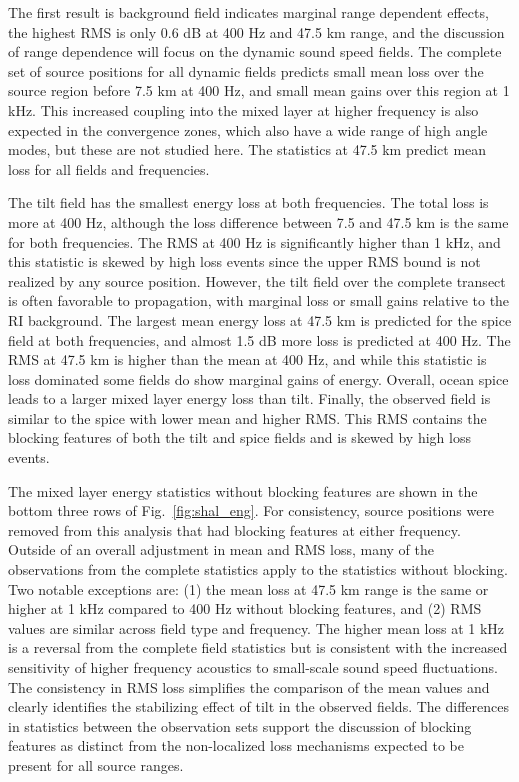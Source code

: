 \documentclass[preprint,NumberedRefs]{JASA}
\begin{document}
The first result is background field indicates marginal range dependent effects, the highest RMS is only 0.6 dB at 400 Hz and 47.5 km range, and the discussion of range dependence will focus on the dynamic sound speed fields. The complete set of source positions for all dynamic fields predicts small mean loss over the source region before 7.5 km at 400 Hz, and small mean gains over this region at 1 kHz. This increased coupling into the mixed layer at higher frequency is also expected in the convergence zones, which also have a wide range of high angle modes, but these are not studied here. The statistics at 47.5 km predict mean loss for all fields and frequencies.

The tilt field has the smallest energy loss at both frequencies. The total loss is more at 400 Hz, although the loss difference between 7.5 and 47.5 km is the same for both frequencies. The RMS at 400 Hz is significantly higher than 1 kHz, and this statistic is skewed by high loss events since the upper RMS bound is not realized by any source position. However, the tilt field over the complete transect is often favorable to propagation, with marginal loss or small gains relative to the RI background. The largest mean energy loss at 47.5 km is predicted for the spice field at both frequencies, and almost 1.5 dB more loss is predicted at 400 Hz. The RMS at 47.5 km is higher than the mean at 400 Hz, and while this statistic is loss dominated some fields do show marginal gains of energy. Overall, ocean spice leads to a larger mixed layer energy loss than tilt. Finally, the observed field is similar to the spice with lower mean and higher RMS. This RMS contains the blocking features of both the tilt and spice fields and is skewed by high loss events.

The mixed layer energy statistics without blocking features are shown in the bottom three rows of Fig.~\ref{fig:shal_eng}. For consistency, source positions were removed from this analysis that had blocking features at either frequency. Outside of an overall adjustment in mean and RMS loss, many of the observations from the complete statistics apply to the statistics without blocking. Two notable exceptions are: (1) the mean loss at 47.5 km range is the same or higher at 1 kHz compared to 400 Hz without blocking features, and (2) RMS values are similar across field type and frequency. The higher mean loss at 1 kHz is a reversal from the complete field statistics but is consistent with the increased sensitivity of higher frequency acoustics to small-scale sound speed fluctuations. The consistency in RMS loss simplifies the comparison of the mean values and clearly identifies the stabilizing effect of tilt in the observed fields. The differences in statistics between the observation sets support the discussion of blocking features as distinct from the non-localized loss mechanisms expected to be present for all source ranges.
\end{document}
